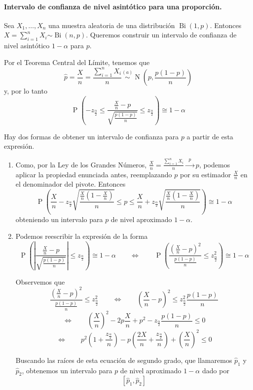 \documentclass[11pt]{article}
\theoremstyle{plain}
\theoremstyle{definition}
\theoremstyle{remark}
\newcommand{\proba}{\ensuremath{\operatorname{P}}}  %
\newcommand{\dists}[1]{\ensuremath{\operatorname{#1}}}  %
\newcommand{\dist}[1]{\ensuremath{\sim \operatorname{#1}}}  %
\newcommand{\distt}[2]{\ensuremath{\overset{#1}{\sim} \operatorname{#2}}}  %
\newcommand{\tiende}[1]{\ensuremath{\xrightarrow{\;\; #1 \;\;}}}  %
\begin{document}
      \paragraph{Intervalo de confianza de nivel asintótico para una proporción.}

        Sea $X_1, \dots, X_n$ una muestra aleatoria de una distribución $\dists{Bi}(1,p)$. Entonces $X = \sum_{i=1}^n X_i \dist{Bi}(n,p)$. Queremos construir un intervalo de confianza de nivel asintótico $1 - \alpha$ para $p$.

        Por el Teorema Central del Límite, tenemos que
        \[ \hat p = \frac{X}{n} = \frac{\sum_{i=1}^n X_i}{n} \distt{(a)}{N}\left( p,\frac{p(1 - p)}{n} \right) \]
        y, por lo tanto
        \[ \proba \left( -z_{\frac{\alpha}{2}} \leq \frac{\frac{X}{n} - p}{\sqrt{\frac{p(1 - p)}{n}}} \leq z_{\frac{\alpha}{2}} \right) \cong 1 - \alpha \]

        Hay dos formas de obtener un intervalo de confianza para $p$ a partir de esta expresión.

        \begin{enumerate}
          \item Como, por la Ley de los Grandes Números, $\frac{X}{n} = \frac{\sum_{i=1}^{n} X_i}{n} \tiende{p} p$, podemos aplicar la propiedad enunciada antes, reemplazando $p$ por su estimador $\frac{X}{n}$ en el denominador del pivote. Entonces
          \[ \proba \left( \frac{X}{n} - z_{\frac{\alpha}{2}} \sqrt{\frac{\frac{X}{n} \left( 1 - \frac{X}{n} \right)}{n}} \leq p \leq \frac{X}{n} + z_{\frac{\alpha}{2}} \sqrt{\frac{\frac{X}{n} \left( 1 - \frac{X}{n} \right)}{n}} \right) \cong 1 - \alpha \]
          obteniendo un intervalo para $p$ de nivel aproximado $1 - \alpha$.
          \item Podemos reescribir la expresión de la forma
          \[ \proba \left( \left| \frac{\frac{X}{n} - p}{\sqrt{\frac{p(1 - p)}{n}}} \right| \leq z_{\frac{\alpha}{2}} \right) \cong 1 - \alpha \qquad \Leftrightarrow \qquad \proba \left( \frac{\left( \frac{X}{n} - p \right)^2}{\frac{p(1 - p)}{n}} \leq z_{\frac{\alpha}{2}}^2 \right) \cong 1 - \alpha \]

          Observemos que
          \[ \frac{\left( \frac{X}{n} - p \right)^2}{\frac{p(1 - p)}{n}} \leq z_{\frac{\alpha}{2}}^2 \qquad \Leftrightarrow \qquad \left( \frac{X}{n} - p \right)^2 \leq z_{\frac{\alpha}{2}}^2 \frac{p(1 - p)}{n} \]
          \[ \Leftrightarrow \qquad \left( \frac{X}{n} \right)^2 - 2 p \frac{X}{n} + p^2 - z_{\frac{\alpha}{2}} \frac{p(1 - p)}{n} \leq 0 \]
          \[ \Leftrightarrow \qquad p^2 \left( 1 + \frac{z_{\frac{\alpha}{2}}}{n} \right) - p \left( \frac{2X}{n} + \frac{z_{\frac{\alpha}{2}}}{n} \right) + \left( \frac{X}{n} \right)^2 \leq 0 \]

          Buscando las raíces de esta ecuación de segundo grado, que llamaremos $\hat p_1$ y $\hat p_2$, obtenemos un intervalo para $p$ de nivel aproximado $1 - \alpha$ dado por
          \[ [\hat p_1, \hat p_2] \]
          
        \end{enumerate}
\end{document}
